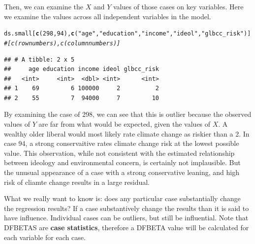 \documentclass[11pt,openany]{book}
\makeatletter
\newcommand{\hlnum}[1]{\textcolor[rgb]{0.686,0.059,0.569}{#1}}%
\newcommand{\hlstr}[1]{\textcolor[rgb]{0.192,0.494,0.8}{#1}}%
\newcommand{\hlcom}[1]{\textcolor[rgb]{0.678,0.584,0.686}{\textit{#1}}}%
\newcommand{\hlstd}[1]{\textcolor[rgb]{0.345,0.345,0.345}{#1}}%
\newcommand{\hlkwd}[1]{\textcolor[rgb]{0.737,0.353,0.396}{\textbf{#1}}}%
\newenvironment{kframe}{%
 \def\at@end@of@kframe{}%
 \ifinner\ifhmode%
  \def\at@end@of@kframe{\end{minipage}}%
  \begin{minipage}{\columnwidth}%
 \fi\fi%
 \def\FrameCommand##1{\hskip\@totalleftmargin \hskip-\fboxsep
 \colorbox{shadecolor}{##1}\hskip-\fboxsep
     \hskip-\linewidth \hskip-\@totalleftmargin \hskip\columnwidth}%
 \MakeFramed {\advance\hsize-\width
   \@totalleftmargin\z@ \linewidth\hsize
   \@setminipage}}%
 {\par\unskip\endMakeFramed%
 \at@end@of@kframe}
\newenvironment{knitrout}{}{} %
\renewenvironment{knitrout}{\begin{singlespace}}{\end{singlespace}}
\makeatother
\begin{document}
Then, we can examine the $X$ and $Y$ values of those cases on key variables. Here we examine the values across all independent variables in the model.  

\begin{knitrout}
\color{fgcolor}\begin{kframe}
\begin{alltt}
\hlstd{ds.small[}\hlkwd{c}\hlstd{(}\hlnum{298}\hlstd{,}\hlnum{94}\hlstd{),}\hlkwd{c}\hlstd{(}\hlstr{"age"}\hlstd{,}\hlstr{"education"}\hlstd{,}\hlstr{"income"}\hlstd{,}\hlstr{"ideol"}\hlstd{,}\hlstr{"glbcc_risk"}\hlstd{)]} \hlcom{# [c(row numbers),c(column numbers)]}
\end{alltt}
\begin{verbatim}
## # A tibble: 2 x 5
##     age education income ideol glbcc_risk
##   <int>     <int>  <dbl> <int>      <int>
## 1    69         6 100000     2          2
## 2    55         7  94000     7         10
\end{verbatim}
\end{kframe}
\end{knitrout}

By examining the case of 298, we can see that this is outlier because the observed values of $Y$ are far from what would be expected, given the values of $X$. A wealthy older liberal would most likely rate climate change as riskier than a 2. In case 94, a strong conservaitive rates climate change risk at the lowest possible value.  This observation, while not consistent with the estimated relationship between ideology and environmental concern, is certainly not implausible.  But the unusual appearance of a case with a strong conservative leaning, and high risk of cliamte change results in a large residual.

What we really want to know is: does any particular case substantially change the regression results? If a case  substantively change the results than it is said to have influence. Individual cases can be outliers, but still be influential.  Note that DFBETAS are \textbf{case statistics}, therefore a DFBETA value will be calculated for each variable for each case.   
\end{document}
